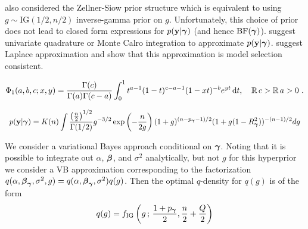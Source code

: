 \cite{Liang2008} also considered
the Zellner-Siow prior structure \citep{Zellner1980} which is
equivalent to using $g\sim \mbox{IG}(1/2,n/2)$ inverse-gamma prior on $g$. 
Unfortunately, this choice of prior does not
lead to closed form expressions for $p({\bf y}|{\boldsymbol \gamma})$ (and hence $\mbox{BF}({\boldsymbol \gamma})$).
\cite{Bayarri2007}
suggest univariate quadrature or Monte Calro integration to approximate $p({\bf y}|{\boldsymbol \gamma})$. \cite{Liang2008} suggest Laplace approximation and show that
this approximation is model selection consistent. 

$$
\Phi_1(a,b,c;x,y) = \frac{\Gamma(c)} {\Gamma(a) \Gamma(c-a)} 
\int_0^1 t^{a-1} (1-t)^{c-a-1} (1-xt)^{-b} e^{yt} \,\mathrm{d}t, 
\quad {\mathbb R} \,c > {\mathbb R} \,a > 0 ~.
$$


$$
\begin{array}{rl}
\ds p(\vy|\vgamma)
\ds = K(n) \int \frac{\left(\tfrac{n}{2}\right)^{1/2}}{\Gamma(1/2)}
g^{-3/2}\exp\left( -\frac{n}{2g} \right)
(1 + g)^{(n - p_\vgamma - 1)/2}(1 + g (1 - R_\vgamma^2))^{-(n-1)/2}
dg
\\

\end{array} 
$$

We consider a variational Bayes approach conditional on ${\boldsymbol \gamma}$. Noting that it is possible
to integrate out $\alpha$, ${\boldsymbol \beta}$, and $\sigma^2$ analytically, but not $g$ for this hyperprior
we consider a VB approximation corresponding to the factorization
$q(\alpha,{\boldsymbol \beta}_{\boldsymbol \gamma},\sigma^2,g) = q(\alpha,{\boldsymbol \beta}_{\boldsymbol \gamma},\sigma^2)q(g)$.
Then the optimal $q$-density for $q(g)$ is of the form
$$
\displaystyle q(g) 
= f_{\mbox{\scriptsize IG}}\left(  g \,;\, \frac{1+p_{\boldsymbol \gamma}}{2}, \frac{n}{2} + \frac{Q}{2}  \right)
$$

